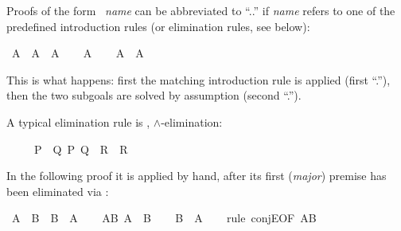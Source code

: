 \begin{isabellebody}
\begin{isamarkuptext}
Proofs of the form ~\emph{name}\isa{{\isacharparenright}}
can be abbreviated to ``..''  if \emph{name} refers to one of the
predefined introduction rules (or elimination rules, see below):%
\end{isamarkuptext}%
\isamarkupfalse%
\ {\isachardoublequote}A\ {\isasymlongrightarrow}\ A\ {\isasymand}\ A{\isachardoublequote}\isanewline
%
\isadelimproof
%
\endisadelimproof
%
\isatagproof
\isamarkupfalse%
\isanewline
\ \ \isamarkupfalse%
\ {\isachardoublequote}A{\isachardoublequote}\isanewline
\ \ \isamarkupfalse%
\ {\isachardoublequote}A\ {\isasymand}\ A{\isachardoublequote}\ \isamarkupfalse%
\isacommand{{\isachardot}{\isachardot}}\isanewline
\isamarkupfalse%
%
\endisatagproof
{\isafoldproof}%
%
\isadelimproof
%
\endisadelimproof
\isamarkuptrue%
%
\begin{isamarkuptext}%
\noindent
This is what happens: first the matching introduction rule 
is applied (first ``.''), then the two subgoals are solved by assumption
(second ``.'').%
\end{isamarkuptext}%
\isamarkuptrue%
%
\isamarkuptrue%
%
\begin{isamarkuptext}%
A typical elimination rule is , $\land$-elimination:
\begin{isabelle}%
\ \ \ \ \ {\isasymlbrakk}{\isacharquery}P\ {\isasymand}\ {\isacharquery}Q{\isacharsemicolon}\ {\isasymlbrakk}{\isacharquery}P{\isacharsemicolon}\ {\isacharquery}Q{\isasymrbrakk}\ {\isasymLongrightarrow}\ {\isacharquery}R{\isasymrbrakk}\ {\isasymLongrightarrow}\ {\isacharquery}R%
\end{isabelle}  In the following proof it is applied
by hand, after its first (\emph{major}) premise has been eliminated via
:%
\end{isamarkuptext}%
\isamarkupfalse%
\ {\isachardoublequote}A\ {\isasymand}\ B\ {\isasymlongrightarrow}\ B\ {\isasymand}\ A{\isachardoublequote}\isanewline
%
\isadelimproof
%
\endisadelimproof
%
\isatagproof
\isamarkupfalse%
\isanewline
\ \ \isamarkupfalse%
\ AB{\isacharcolon}\ {\isachardoublequote}A\ {\isasymand}\ B{\isachardoublequote}\isanewline
\ \ \isamarkupfalse%
\ {\isachardoublequote}B\ {\isasymand}\ A{\isachardoublequote}\isanewline
\ \ \isamarkupfalse%
\ {\isacharparenleft}rule\ conjE{\isacharbrackleft}OF\ AB{\isacharbrackright}{\isacharparenright}\ \ %

\end{isabellebody}
